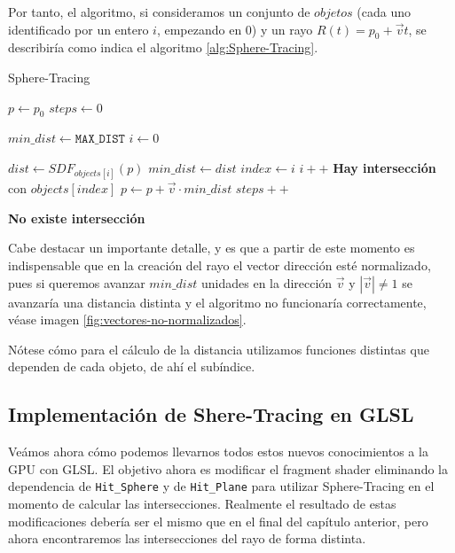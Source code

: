 Por tanto, el algoritmo, si consideramos un conjunto de $objetos$ (cada uno identificado por un entero $i$, empezando en $0$) y un rayo $R(t)=p_0 + \vec v t$, se describiría como indica el algoritmo \ref{alg:Sphere-Tracing}.

\begin{algorithm}[t]
\caption{Sphere-Tracing} \label{alg:Sphere-Tracing}
\begin{algorithmic}
\State $p\gets p_0$
\State $steps \gets 0$

    \State $min\_dist \gets \mathtt{MAX\_DIST}$
    \State $i\gets 0$
    
        \State $dist \gets SDF_{objects[i]}(p)$
            \State $min\_dist \gets dist$
            \State $index\gets i$
        \EndIf
        \State $i++$
    \EndWhile
        \State \textbf{Hay intersección} con $objects[index]$
    \Else
        \State $p\gets p + \vec v \cdot min\_dist$ 
    \EndIf
    \State $steps++$
\EndWhile

\State \textbf{No existe intersección}
\EndProcedure
\end{algorithmic}
\end{algorithm}

\begin{observacion}
\label{observacion:vector-normalizado}
    Cabe destacar un importante detalle, y es que a partir de este momento es indispensable que en la creación del rayo el vector dirección esté normalizado, pues si queremos avanzar $min\_dist$ unidades en la dirección $\vec v$ y $|\vec v| \not= 1$ se avanzaría una distancia distinta y el algoritmo no funcionaría correctamente, véase imagen \ref{fig:vectores-no-normalizados}.
\end{observacion}

Nótese cómo para el cálculo de la distancia utilizamos funciones distintas que dependen de cada objeto, de ahí el subíndice.

\subsection{Implementación de Shere-Tracing en GLSL}

Veámos ahora cómo podemos llevarnos todos estos nuevos conocimientos a la GPU con GLSL. El objetivo ahora es modificar el fragment shader eliminando la dependencia de \verb|Hit_Sphere| y de \verb|Hit_Plane| para utilizar Sphere-Tracing en el momento de calcular las intersecciones. Realmente el resultado de estas modificaciones debería ser el mismo que en el final del capítulo anterior, pero ahora encontraremos las intersecciones del rayo de forma distinta. 


